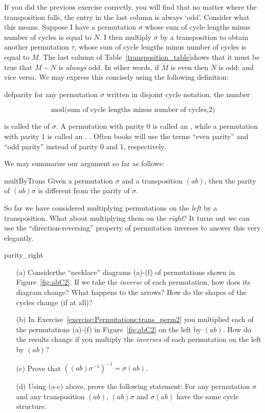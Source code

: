 If you did the previous exercise correctly, you will find that no matter where the transposition falls,  the entry in the last column   is always `odd'. Consider what this means. Suppose I have a permutation  $\sigma$ whose sum of cycle lengths minus number of cycles is equal to $N$. I then multiply $\sigma$ by a transposition to obtain another permutation $\tau$, whose sum of cycle lengths minus number of cycles is equal to $M$. The last column of Table~\ref{transposition_table}shows that it must be true that $M-N$ is \emph{always} odd. In other words, if $M$ is even then $N$ is odd: and vice versa. We may express this concisely using the following definition:


\begin{defn}{defparity} for any permutation $\sigma$ written in disjoint cycle notation, the number 

\[ \text{mod(sum of cycle lengths minus number of cycles,2)} \]

\noindent
is called the  of $\sigma$. A permutation with parity 0 is called an , while a  permutation with parity 1 is called an . .  Often books will use the terms ``even parity'' and ``odd parity''  instead of parity 0 and 1, respectively.
\end{defn}

We may  summarize our argument so far as follows:

\begin{prop}{multByTrans}
Given a permutation $\sigma$ and a transposition $(ab)$, then the parity of $(ab)\sigma$ is different from the parity of $\sigma$.
\end{prop}

So far we have considered multiplying permutations on the \emph{left} by a transposition. What about multiplying them on the \emph{right}? It turns out we can use the ``direction-reversing'' property of permutation inverses to answer this very elegantly.

\begin{exercise}{parity_right}
\begin{enumerate}
\item[(a)]
Considerthe ``necklace'' diagrams  (a)-(f) of permutations shown in Figure~\ref{fig:abC2}. If  we take the \emph{inverse} of each permutation, how does its diagram change? What happens to the arrows? How do the shapes of the cycles change (if at all)? 
\item[(b)] 
In Exercise~\ref{exercise:Permutations:trans_perm2} you multiplied each of the permutations (a)-(f) in Figure~\ref{fig:abC2} on the left by $(ab)$.  How do the results change if you multiply the \emph{inverses} of each permutation on the left by $(ab)$?
\item[(c)]
Prove that $\left( (ab) \sigma^{-1} \right)^{-1} = \sigma(ab)$.
\item[(d)]
Using (a-c) above, prove the following statement:  For any permutation $\sigma$ and any transposition $(ab)$, $(ab) \sigma$ and $\sigma (ab)$ have the same cycle structure.
\end{enumerate}
\end{exercise}

